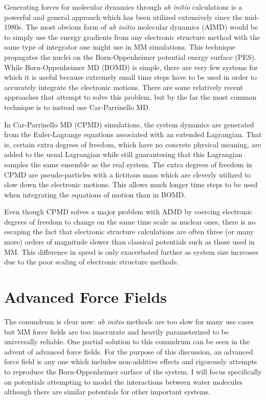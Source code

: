 \documentclass[11pt, proquest]{uwthesis}[2020/02/24]
\begin{document}
\par Generating forces for molecular dynamics through \textit{ab initio} calculations is a powerful and general approach which has been utilized extensively since the mid-1980s. The most obvious form of \textit{ab initio} molecular dynamics (AIMD) would be to simply use the energy gradients from any electronic structure method with the same type of integrator one might use in MM simulations. This technique propagates the nuclei on the Born-Oppenheimer potential energy surface (PES). While Born-Oppenheimer MD (BOMD) is simple, there are very few systems for which it is useful because extremely small time steps have to be used in order to accurately integrate the electronic motions. There are some relatively recent approaches that attempt to solve this problem\autocite{kuhne_efficient_2007}, but by the far the most common technique is to instead use Car-Parrinello MD\autocite{car_unified_1985}.

\par In Car-Parrinello MD (CPMD) simulations, the system dynamics are generated from the Euler-Lagrange equations associated with an extended Lagrangian. That is, certain extra degrees of freedom, which have no concrete physical meaning, are added to the usual Lagrangian while still guaranteeing that this Lagrangian samples the same ensemble as the real system. The extra degrees of freedom in CPMD are pseudo-particles with a fictitous mass which are cleverly utilized to slow down the electronic motions. This allows much longer time steps to be used when integrating the equations of motion than in BOMD.

\par Even though CPMD solves a major problem with AIMD by coercing electronic degrees of freedom to change on the same time scale as nuclear ones, there is no escaping the fact that electronic structure calculations are often three (or many more) orders of magnitude slower than classical potentials such as those used in MM. This difference in speed is only exacerbated further as system size increases due to the poor scaling of electronic structure methods.

\section{Advanced Force Fields}

\par The conundrum is clear now: \textit{ab initio} methods are too slow for many use cases but MM force fields are too inaccurate and heavily parameterized to be universally reliable. One partial solution to this conundrum can be seen in the advent of advanced force fields. For the purpose of this discussion, an advanced force field is any one which includes non-additive effects and rigorously attempts to reproduce the Born-Oppenheimer surface of the system. I will focus specifically on potentials attempting to model the interactions between water molecules although there are similar potentials for other important systems.
\end{document}
